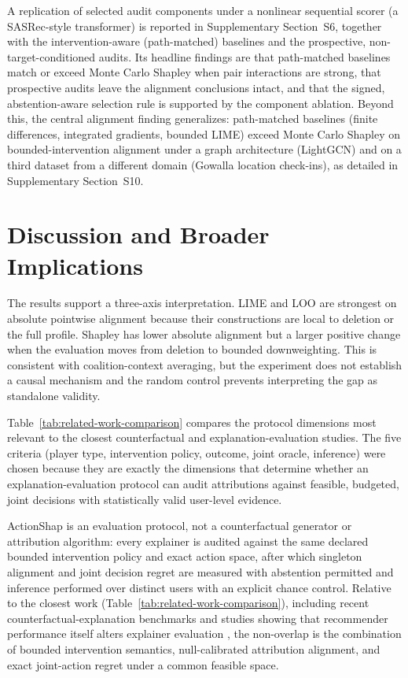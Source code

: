 \documentclass[a4paper,fleqn,doubleblind]{cas-sc}
\begin{document}
A replication of selected audit components under a nonlinear sequential scorer (a SASRec-style transformer) is reported in Supplementary Section~S6, together with the intervention-aware (path-matched) baselines and the prospective, non-target-conditioned audits. Its headline findings are that path-matched baselines match or exceed Monte Carlo Shapley when pair interactions are strong, that prospective audits leave the alignment conclusions intact, and that the signed, abstention-aware selection rule is supported by the component ablation. Beyond this, the central alignment finding generalizes: path-matched baselines (finite differences, integrated gradients, bounded LIME) exceed Monte Carlo Shapley on bounded-intervention alignment under a graph architecture (LightGCN) and on a third dataset from a different domain (Gowalla location check-ins), as detailed in Supplementary Section~S10.

\section{Discussion and Broader Implications}
The results support a three-axis interpretation. LIME and LOO are strongest on absolute pointwise alignment because their constructions are local to deletion or the full profile. Shapley has lower absolute alignment but a larger positive change when the evaluation moves from deletion to bounded downweighting. This is consistent with coalition-context averaging, but the experiment does not establish a causal mechanism and the random control prevents interpreting the gap as standalone validity.

Table~\ref{tab:related-work-comparison} compares the protocol dimensions most relevant to the closest counterfactual and explanation-evaluation studies. The five criteria (player type, intervention policy, outcome, joint oracle, inference) were chosen because they are exactly the dimensions that determine whether an explanation-evaluation protocol can audit attributions against feasible, budgeted, joint decisions with statistically valid user-level evidence.

ActionShap is an evaluation protocol, not a counterfactual generator or attribution algorithm: every explainer is audited against the same declared bounded intervention policy and exact action space, after which singleton alignment and joint decision regret are measured with abstention permitted and inference performed over distinct users with an explicit chance control. Relative to the closest work (Table~\ref{tab:related-work-comparison}), including recent counterfactual-explanation benchmarks and studies showing that recommender performance itself alters explainer evaluation \cite{mohammadi2024recsys,nguyen2026}, the non-overlap is the combination of bounded intervention semantics, null-calibrated attribution alignment, and exact joint-action regret under a common feasible space.
\end{document}
